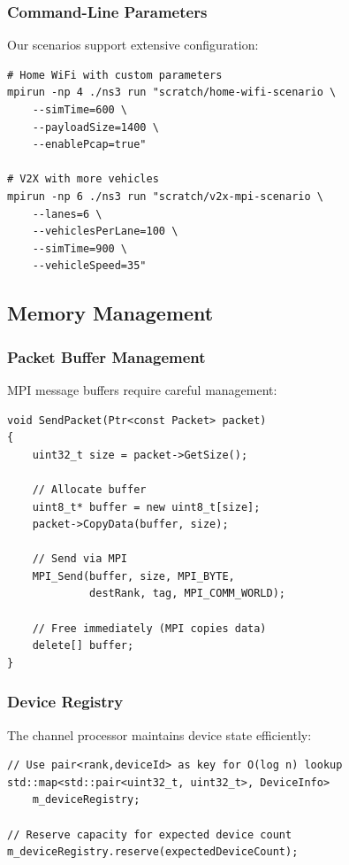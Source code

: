 \subsubsection{Command-Line Parameters}

Our scenarios support extensive configuration:

\begin{lstlisting}[style=bash, caption={Command-line configuration}]
# Home WiFi with custom parameters
mpirun -np 4 ./ns3 run "scratch/home-wifi-scenario \
    --simTime=600 \
    --payloadSize=1400 \
    --enablePcap=true"

# V2X with more vehicles
mpirun -np 6 ./ns3 run "scratch/v2x-mpi-scenario \
    --lanes=6 \
    --vehiclesPerLane=100 \
    --simTime=900 \
    --vehicleSpeed=35"
\end{lstlisting}

\subsection{Memory Management}

\subsubsection{Packet Buffer Management}

MPI message buffers require careful management:

\begin{lstlisting}[style=cpp, caption={Buffer lifecycle management}]
void SendPacket(Ptr<const Packet> packet)
{
    uint32_t size = packet->GetSize();
    
    // Allocate buffer
    uint8_t* buffer = new uint8_t[size];
    packet->CopyData(buffer, size);
    
    // Send via MPI
    MPI_Send(buffer, size, MPI_BYTE, 
             destRank, tag, MPI_COMM_WORLD);
    
    // Free immediately (MPI copies data)
    delete[] buffer;
}
\end{lstlisting}

\subsubsection{Device Registry}

The channel processor maintains device state efficiently:

\begin{lstlisting}[style=cpp, caption={Efficient device registry}]
// Use pair<rank,deviceId> as key for O(log n) lookup
std::map<std::pair<uint32_t, uint32_t>, DeviceInfo> 
    m_deviceRegistry;

// Reserve capacity for expected device count
m_deviceRegistry.reserve(expectedDeviceCount);
\end{lstlisting}

